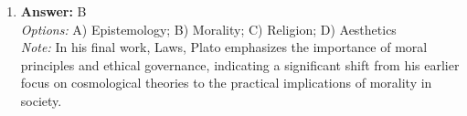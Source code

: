 \documentclass[12pt]{article}
\begin{document}
\begin{enumerate}[label=\arabic*.]
\\ \textit{Note:} Arthur believes that values such as justice, equality, and community are more fundamental than individual rights and desert, as they provide the foundational principles that guide and shape ethical considerations and social interactions.
\item \textbf{Answer:} B
\\ \textit{Options:} A) Epistemology; B) Morality; C) Religion; D) Aesthetics
\\ \textit{Note:} In his final work, Laws, Plato emphasizes the importance of moral principles and ethical governance, indicating a significant shift from his earlier focus on cosmological theories to the practical implications of morality in society.
\end{enumerate}
\end{document}
